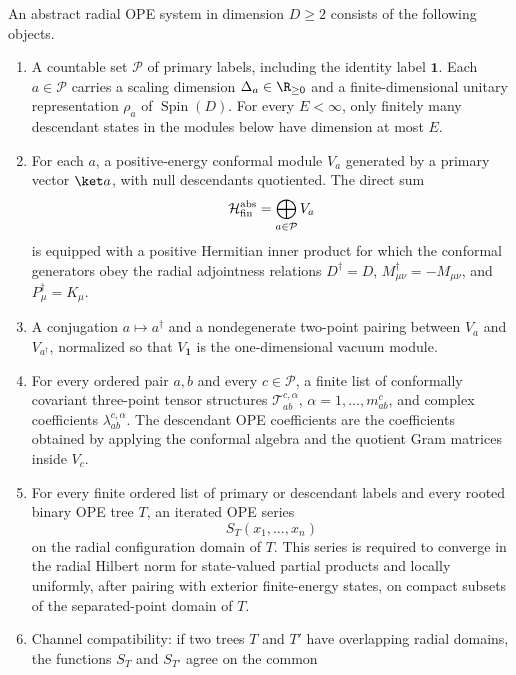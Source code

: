\begin{definition}
\label{def:abstract-radial-ope-system}
An abstract radial OPE system in dimension \(D\ge2\) consists of the following
objects.
\begin{enumerate}[label=(\roman*)]
  \item A countable set \(\mathcal P\) of primary labels, including the
  identity label \(\mathbf 1\).  Each \(a\in\mathcal P\) carries a scaling
  dimension \(\Delta_a\in\R_{\ge0}\) and a finite-dimensional unitary
  representation \(\rho_a\) of \(\operatorname{Spin}(D)\).  For every
  \(E<\infty\), only finitely many descendant states in the modules below have
  dimension at most \(E\).
  \item For each \(a\), a positive-energy conformal module
  \(V_a\) generated by a primary vector \(\ket a\), with null descendants
  quotiented.  The direct sum
  \[
    \mathcal H_{\rm fin}^{\rm abs}
    =
    \bigoplus_{a\in\mathcal P} V_a
  \]
  is equipped with a positive Hermitian inner product for which the conformal
  generators obey the radial adjointness relations
  \(D^\dagger=D\), \(M_{\mu\nu}^\dagger=-M_{\mu\nu}\), and
  \(P_\mu^\dagger=K_\mu\).
  \item A conjugation \(a\mapsto a^\dagger\) and a nondegenerate two-point
  pairing between \(V_a\) and \(V_{a^\dagger}\), normalized so that
  \(V_{\mathbf 1}\) is the one-dimensional vacuum module.
  \item For every ordered pair \(a,b\) and every \(c\in\mathcal P\), a finite
  list of conformally covariant three-point tensor structures
  \(\mathcal T_{ab}^{c,\alpha}\), \(\alpha=1,\ldots,m_{ab}^{c}\), and
  complex coefficients \(\lambda_{ab}^{c,\alpha}\).  The descendant OPE
  coefficients are the coefficients obtained by applying the conformal algebra
  and the quotient Gram matrices inside \(V_c\).
  \item For every finite ordered list of primary or descendant labels and every
  rooted binary OPE tree \(T\), an iterated OPE series
  \[
    S_T(x_1,\ldots,x_n)
  \]
  on the radial configuration domain of \(T\).  This series is required to
  converge in the radial Hilbert norm for state-valued partial products and
  locally uniformly, after pairing with exterior finite-energy states, on
  compact subsets of the separated-point domain of \(T\).
  \item Channel compatibility: if two trees \(T\) and \(T'\) have overlapping
  radial domains, the functions \(S_T\) and \(S_{T'}\) agree on the common

\end{enumerate}
\end{definition}
